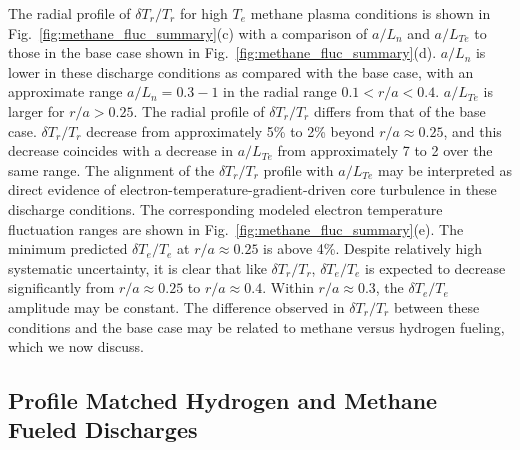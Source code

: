 \documentclass[%
 aip,
 amsmath,amssymb,
 reprint,%
]{revtex4-1}
\begin{document}
The radial profile of $\delta T_r /T_r$ for high $T_e$ methane plasma conditions is shown in Fig.\ \ref{fig:methane_fluc_summary}(c) with a comparison of $a/L_n$ and $a/L_{Te}$ to those in the base case shown in Fig.\ \ref{fig:methane_fluc_summary}(d). $a/L_n$ is lower in these discharge conditions as compared with the base case, with an approximate range $a/L_n=0.3-1$ in the radial range $0.1 < r/a < 0.4$. $a/L_{Te}$ is larger for $r/a>0.25$. The radial profile of $\delta T_r/T_r$ differs from that of the base case. $\delta T_r/T_r$ decrease from approximately 5\% to 2\% beyond $r/a\approx 0.25$, and this decrease coincides with a decrease in $a/L_{Te}$ from approximately 7 to 2 over the same range. The alignment of the $\delta T_r/T_r$  profile with $a/L_{Te}$ may be interpreted as direct evidence of electron-temperature-gradient-driven core turbulence in these discharge conditions. The corresponding modeled electron temperature fluctuation ranges are shown in Fig.\ \ref{fig:methane_fluc_summary}(e). The minimum predicted $\delta T_e/T_e$  at $r/a\approx0.25$ is above 4\%. Despite relatively high systematic uncertainty, it is clear that like $\delta T_r/T_r$, $\delta T_e/T_e$  is expected to decrease significantly from $r/a\approx0.25$ to $r/a\approx0.4$. Within $r/a\approx0.3$, the $\delta T_e/T_e$  amplitude may be constant. The difference observed in $\delta T_r/T_r$ between these conditions and the base case may be related to methane versus hydrogen fueling, which we now discuss.


\subsection{Profile Matched Hydrogen and Methane Fueled Discharges} \label{sec:h2_vs_ch4_dTr}
\end{document}
